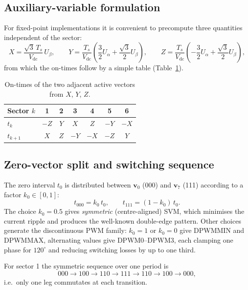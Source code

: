 \documentclass[11pt,a4paper]{article}
\newcommand{\vdc}{V_{\mathrm{dc}}}
\newcommand{\Ts}{T_{s}}
\newcommand{\ualpha}{U_{\alpha}}
\newcommand{\ubeta}{U_{\beta}}
\begin{document}
\subsection{Auxiliary-variable formulation}

For fixed-point implementations it is convenient to precompute three quantities
independent of the sector:
\begin{equation}
X = \frac{\sqrt{3}\,\Ts}{\vdc}\,\ubeta, \qquad
Y = \frac{\Ts}{\vdc}\left(\frac{3}{2}\ualpha + \frac{\sqrt{3}}{2}\ubeta\right), \qquad
Z = \frac{\Ts}{\vdc}\left(-\frac{3}{2}\ualpha + \frac{\sqrt{3}}{2}\ubeta\right),
\end{equation}
from which the on-times follow by a simple table (Table~\ref{tab:xyz}).

\begin{table}[h]
\centering
\begin{tabular}{lcccccc}
\toprule
Sector $k$ & 1 & 2 & 3 & 4 & 5 & 6 \\
\midrule
$t_k$      & $-Z$ & $Y$  & $X$  & $Z$  & $-Y$ & $-X$ \\
$t_{k+1}$  & $X$  & $Z$  & $-Y$ & $-X$ & $-Z$ & $Y$ \\
\bottomrule
\end{tabular}
\caption{On-times of the two adjacent active vectors from $X$, $Y$, $Z$.}
\label{tab:xyz}
\end{table}

\subsection{Zero-vector split and switching sequence}

The zero interval $t_0$ is distributed between $\bm{v}_0$ (000) and $\bm{v}_7$ (111)
according to a factor $k_0 \in [0,1]$:
\begin{equation}
t_{000} = k_0\,t_0, \qquad t_{111} = (1-k_0)\,t_0 .
\end{equation}
The choice $k_0 = 0.5$ gives \emph{symmetric} (centre-aligned) SVM, which minimises
the current ripple and produces the well-known double-edge pattern. Other choices
generate the discontinuous PWM family: $k_0 = 1$ or $k_0 = 0$ give DPWMMIN and
DPWMMAX, alternating values give DPWM0--DPWM3, each clamping one phase for $120^\circ$
and reducing switching losses by up to one third.

For sector 1 the symmetric sequence over one period is
\begin{equation}
000 \rightarrow 100 \rightarrow 110 \rightarrow 111 \rightarrow 110 \rightarrow 100 \rightarrow 000,
\end{equation}
i.e.\ only one leg commutates at each transition.
\end{document}
